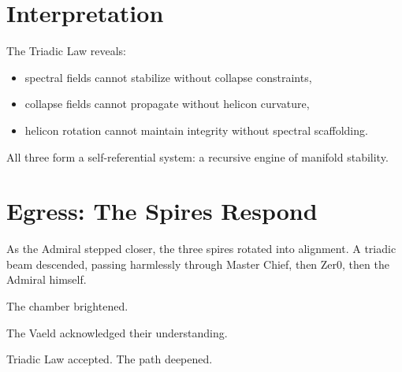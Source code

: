 \section{Interpretation}
The Triadic Law reveals:
\begin{itemize}
\item spectral fields cannot stabilize without collapse constraints,
\item collapse fields cannot propagate without helicon curvature,
\item helicon rotation cannot maintain integrity without spectral scaffolding.
\end{itemize}

All three form a self-referential system:  
a recursive engine of manifold stability.

\section*{Egress: The Spires Respond}
As the Admiral stepped closer, the three spires rotated into alignment.
A triadic beam descended, passing harmlessly through Master Chief,
then Zer0, then the Admiral himself.

The chamber brightened.

The Vaeld acknowledged their understanding.

Triadic Law accepted.  
The path deepened.
